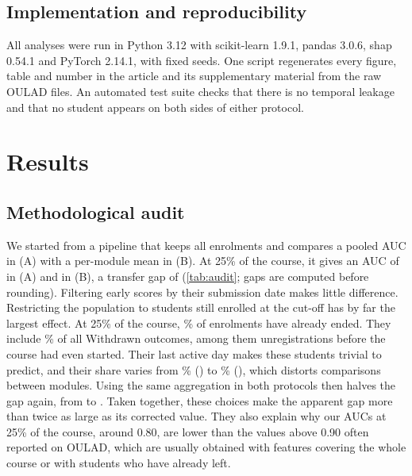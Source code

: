 \documentclass[journal]{IEEEtran}
\newcommand{\cA}{(A)}
\newcommand{\cB}{(B)}
\begin{document}
\subsection{Implementation and reproducibility}
All analyses were run in Python 3.12 with scikit-learn 1.9.1, pandas 3.0.6, shap 0.54.1 and PyTorch 2.14.1, with fixed seeds. One script regenerates every figure, table and number in the article and its supplementary material from the raw OULAD files. An automated test suite checks that there is no temporal leakage and that no student appears on both sides of either protocol.

\section{Results}
\label{sec:results}



\subsection{Methodological audit}
\label{sec:audit}
We started from a pipeline that keeps all enrolments and compares a pooled AUC in \cA{} with a per-module mean in \cB. At 25\% of the course, it gives an AUC of \resRefA{} in \cA{} and \resRefB{} in \cB, a transfer gap of \resRefGap{} (\cref{tab:audit}; gaps are computed before rounding). Filtering early scores by their submission date makes little difference. Restricting the population to students still enrolled at the cut-off has by far the largest effect. At 25\% of the course, \resPctGone\% of enrolments have already ended. They include \resPctWithdrawnGone\% of all Withdrawn outcomes, among them \resNGoneBeforeStart{} unregistrations before the course had even started. Their last active day makes these students trivial to predict, and their share varies from \resGoneMin\% (\resGoneMinMod) to \resGoneMax\% (\resGoneMaxMod), which distorts comparisons between modules. Using the same aggregation in both protocols then halves the gap again, from \resPooledGap{} to \resSameAggGap. Taken together, these choices make the apparent gap more than twice as large as its corrected value. They also explain why our AUCs at 25\% of the course, around 0.80, are lower than the values above 0.90 often reported on OULAD, which are usually obtained with features covering the whole course or with students who have already left.
\end{document}
